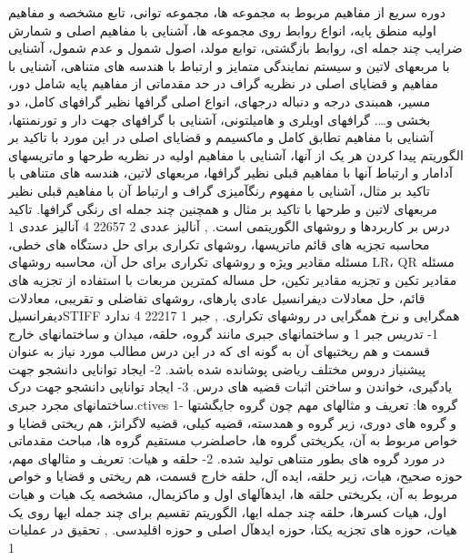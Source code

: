 \documentclass[class=article, crop=false]{standalone}
\begin{document}
{{{{            دوره سریع از مفاهیم مربوط به مجموعه ها، مجموعه توانی، تابع مشخصه و مفاهیم اولیه منطق پایه، انواع روابط روی مجموعه ها، آشنایی با مفاهیم اصلی و شمارش ضرایب چند جمله ای، روابط بازگشتی، توابع مولد، اصول شمول و عدم شمول، آشنایی با مربعهای لاتین و سیستم نمایندگی متمایز و ارتباط با هندسه های متناهی، آشنایی با مفاهیم و قضایای اصلی در نظریه گراف در حد مقدماتی از مفاهیم پایه شامل دور، مسیر، همبندی درجه و دنباله درجهای، انواع اصلی گرافها نظیر گرافهای کامل، دو بخشی و…. گرافهای اویلری و هامیلتونی، آشنایی با گرافهای جهت دار و تورنمنتها، آشنایی با مفاهیم تطابق کامل و ماکسیمم و قضایای اصلی در این مورد با تاکید بر الگوریتم پیدا کردن هر یک از آنها، آشنایی با مفاهیم اولیه در نظریه طرحها و ماتریسهای آدامار و ارتباط آنها با مفاهیم قبلی نظیر گرافها، مربعهای لاتین، هندسه های متناهی با تاکید بر مثال، آشنایی با مفهوم رنگآمیزی گراف و ارتباط آن با مفاهیم قبلی نظیر مربعهای لاتین و طرحها با تاکید بر مثال و همچنین چند جمله ای رنگی گرافها. تاکید درس بر کاربردها و روشهای الگوریتمی است.
        }}
        },{{
            آنالیز عددی 2
        }{
            22657
        }{
            4
        }{
            آنالیز عددی 1
        }{}{{
            محاسبه تجزیه های قائم ماتریسها، روشهای تکراری برای حل دستگاه های خطی، مسئله مقادیر ویژه و روشهای تکراری برای حل آن، محاسبه روشهای LR، QR مسئله مقادیر تکین و تجزیه مقادیر تکین، حل مساله کمترین مربعات با استفاده از تجزیه های قائم، حل معادلات دیفرانسیل عادی پارهای، روشهای تفاضلی و تقریبی، معادلات دیفرانسیلSTIFF همگرایی و نرخ همگرایی در روشهای تکراری.
        }}
        },{{
            جبر 1
        }{
            22217
        }{
            4
        }{
            ندارد
        }{{
            1- تدریس جبر 1 و ساختمانهای جبری مانند گروه، حلقه، میدان و ساختمانهای خارج قسمت و هم ریختیهای آن به گونه ای که در این درس مطالب مورد نیاز به عنوان پیشنیاز دروس مختلف ریاضی پوشانده شده باشد. 2- ایجاد توانایی دانشجو جهت یادگیری، خواندن و ساختن اثبات قضیه های درس. 3- ایجاد توانایی دانشجو جهت درک ساختمانهای مجرد جبری.ctives
        }}{{
            1- گروه ها: تعریف و مثالهای مهم چون گروه جایگشتها و گروه های دوری، زیر گروه و همدسته، قضیه کیلی، قضیه لاگرانژ، هم ریختی قضایا و خواص مربوط به آن، یکریختی گروه ها، حاصلضرب مستقیم گروه ها، مباحث مقدماتی در مورد گروه های بطور متناهی تولید شده. 2- حلقه و هیات: تعریف و مثالهای مهم، حوزه صحیح، هیات، زیر حلقه، ایده آل، حلقه خارج قسمت، هم ریختی و قضایا و خواص مربوط به آن، یکریختی حلقه ها، ایدهآلهای اول و ماکزیمال، مشخصه یک هیات و هیات اول، هیات کسرها، حلقه چند جمله ایها، الگوریتم تقسیم برای چند جمله ایها روی یک هیات، حوزه های تجزیه یکتا، حوزه ایدهآل اصلی و حوزه اقلیدسی.
        }}
        },{{
            تحقیق در عملیات 1
}}}
\end{document}
